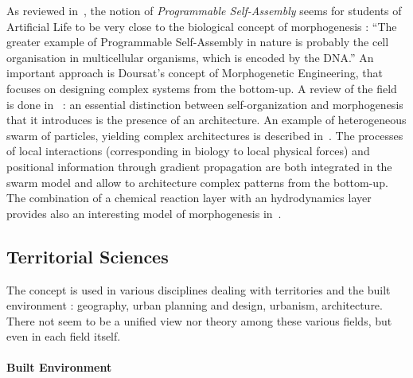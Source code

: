 \documentclass[fleqn,10pt]{wlscirep}
\begin{document}

As reviewed in~\cite{crosato2014self}, the notion of \emph{Programmable Self-Assembly} seems for students of Artificial Life to be very close to the biological concept of morphogenesis : ``The greater example of Programmable Self-Assembly in nature is probably the cell organisation in multicellular organisms, which is encoded by the DNA.'' An important approach is Doursat's concept of Morphogenetic Engineering, that focuses on designing complex systems from the bottom-up. A review of the field is done in~\cite{doursat2013review} : an essential distinction between self-organization and morphogenesis that it introduces is the presence of an architecture. An example of heterogeneous swarm of particles, yielding complex architectures is described in~\cite{doursat2008programmable}. The processes of local interactions (corresponding in biology to local physical forces) and positional information through gradient propagation are both integrated in the swarm model and allow to architecture complex patterns from the bottom-up. The combination of a chemical reaction layer with an hydrodynamics layer provides also an interesting model of morphogenesis in~\cite{cussat2012synthesis}.




\subsection*{Territorial Sciences}

The concept is used in various disciplines dealing with territories and the built environment : geography, urban planning and design, urbanism, architecture. There not seem to be a unified view nor theory among these various fields, but even in each field itself.

\paragraph{Built Environment}
\end{document}
